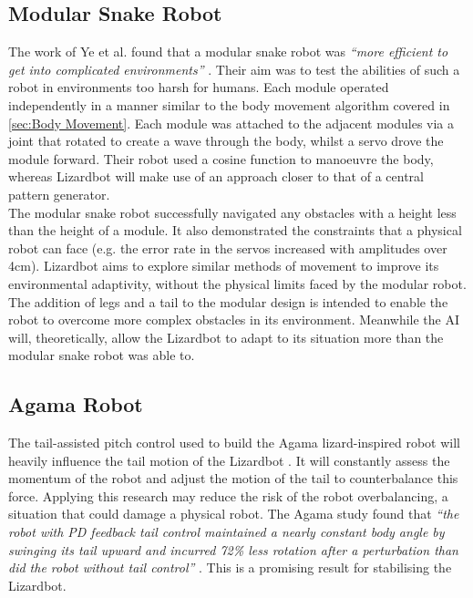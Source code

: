 \documentclass{article}
\begin{document}
\subsection{Modular Snake Robot}
\label{sec:Modular Snake Robot}
The work of Ye et al.  found that a modular snake robot was \textit{“more efficient to get into complicated environments”} . Their aim was to test the abilities of such a robot in environments too harsh for humans. Each module operated independently in a manner similar to the body movement algorithm covered in \ref{sec:Body Movement}. Each module was attached to the adjacent modules via a joint that rotated to create a wave through the body, whilst a servo drove the module forward. Their robot used a cosine function to manoeuvre the body, whereas Lizardbot will make use of an approach closer to that of a central pattern generator. \\
The modular snake robot successfully navigated any obstacles with a height less than the height of a module. It also demonstrated the constraints that a physical robot can face (e.g. the error rate in the servos increased with amplitudes over 4cm). Lizardbot aims to explore similar methods of movement to improve its environmental adaptivity, without the physical limits faced by the modular robot. The addition of legs and a tail to the modular design is intended to enable the robot to overcome more complex obstacles in its environment. Meanwhile the AI will, theoretically, allow the Lizardbot to adapt to its situation more than the modular snake robot was able to.

\subsection{Agama Robot}
\label{sec:Agama Robot}
The tail-assisted pitch control used to build the Agama lizard-inspired robot will heavily influence the tail motion of the Lizardbot . It will constantly assess the momentum of the robot and adjust the motion of the tail to counterbalance this force. Applying this research may reduce the risk of the robot overbalancing, a situation that could damage a physical robot. The Agama study found that \textit{“the robot with PD feedback tail control maintained a nearly constant body angle by swinging its tail upward and incurred 72\% less rotation after a perturbation than did the robot without tail control”} . This is a promising result for stabilising the Lizardbot.
\end{document}
